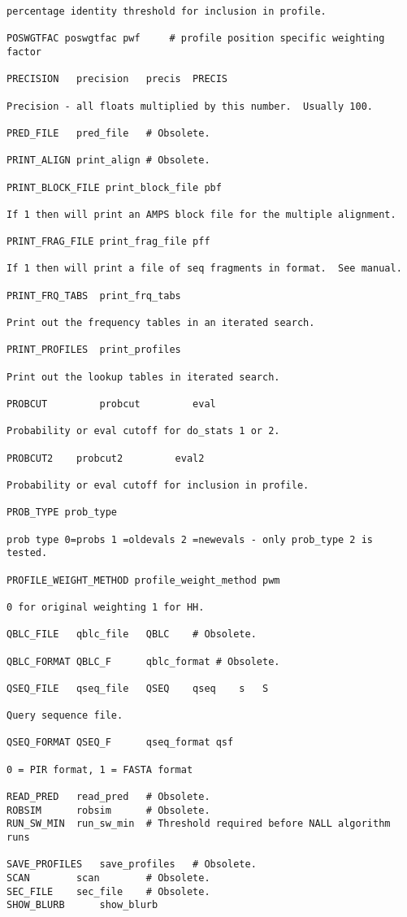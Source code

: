 \documentclass[12pt]{article}
\begin{document}
\begin{scriptsize}
\begin{verbatim}
percentage identity threshold for inclusion in profile.

POSWGTFAC poswgtfac pwf		# profile position specific weighting factor

PRECISION	precision 	precis	PRECIS	

Precision - all floats multiplied by this number.  Usually 100.

PRED_FILE	pred_file	# Obsolete.

PRINT_ALIGN	print_align	# Obsolete.

PRINT_BLOCK_FILE print_block_file pbf 

If 1 then will print an AMPS block file for the multiple alignment.

PRINT_FRAG_FILE print_frag_file pff 

If 1 then will print a file of seq fragments in format.  See manual.

PRINT_FRQ_TABS  print_frq_tabs  

Print out the frequency tables in an iterated search.

PRINT_PROFILES  print_profiles  

Print out the lookup tables in iterated search.

PROBCUT	        probcut         eval 

Probability or eval cutoff for do_stats 1 or 2.

PROBCUT2	probcut2         eval2 

Probability or eval cutoff for inclusion in profile.

PROB_TYPE prob_type             

prob type 0=probs 1 =oldevals 2 =newevals - only prob_type 2 is tested.

PROFILE_WEIGHT_METHOD profile_weight_method pwm 

0 for original weighting 1 for HH.

QBLC_FILE	qblc_file	QBLC	# Obsolete.

QBLC_FORMAT	QBLC_F		qblc_format	# Obsolete.

QSEQ_FILE	qseq_file	QSEQ	qseq	s	S

Query sequence file.

QSEQ_FORMAT	QSEQ_F		qseq_format	qsf	 

0 = PIR format, 1 = FASTA format

READ_PRED	read_pred 	# Obsolete.
ROBSIM		robsim 		# Obsolete.
RUN_SW_MIN	run_sw_min	# Threshold required before NALL algorithm runs

SAVE_PROFILES	save_profiles	# Obsolete.
SCAN		scan		# Obsolete.
SEC_FILE	sec_file	# Obsolete.
SHOW_BLURB      show_blurb      


\end{verbatim}
\end{scriptsize}
\end{document}
